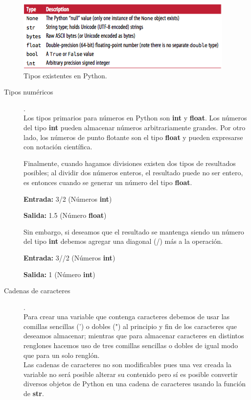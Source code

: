 \documentclass[a4paper]{article}
\begin{document}
\begin{figure}[h!]
	\center
	\includegraphics[scale=.68]{./Images/tipos}
	\caption{\label{fig:tipos} Tipos existentes en Python.}
\end{figure}

\begin{description}
\item[Tipos numéricos].
\\ Los tipos primarios para números en Python son \textbf{int} y \textbf{float}. Los números del tipo \textbf{int} pueden almacenar números arbitrariamente grandes. Por otro lado, los números de punto flotante son el tipo \textbf{float} y pueden expresarse con notación científica. \pagebreak

Finalmente, cuando hagamos divisiones existen dos tipos de resultados posibles; al dividir dos números enteros, el resultado puede no ser entero, es entonces cuando se generar un número del tipo \textbf{float}.

\begin{center}
	\textbf{Entrada:} 3/2 (Números \textbf{int})
	
	\textbf{Salida:} 1.5 (Número \textbf{float})
\end{center}

Sin embargo, si deseamos que el resultado se mantenga siendo un número del tipo \textbf{int} debemos agregar una diagonal (/) más a la operación.

\begin{center}
	\textbf{Entrada:} 3//2 (Números \textbf{int})

	\textbf{Salida:} 1 (Número \textbf{int})	
\end{center}

\item[Cadenas de caracteres].
\\ Para crear una variable que contenga caracteres debemos de usar las comillas sencillas (') o dobles (") al principio y fin de los caracteres que deseamos almacenar; mientras que para almacenar caracteres en distintos renglones hacemos uso de tres comillas sencillas o dobles de igual modo que para un solo renglón.
\\ Las cadenas de caracteres no son modificables pues una vez creada la variable no será posible alterar su contenido pero sí es posible convertir diversos objetos de Python en una cadena de caracteres usando la función de \textbf{str}.


\end{description}
\end{document}
